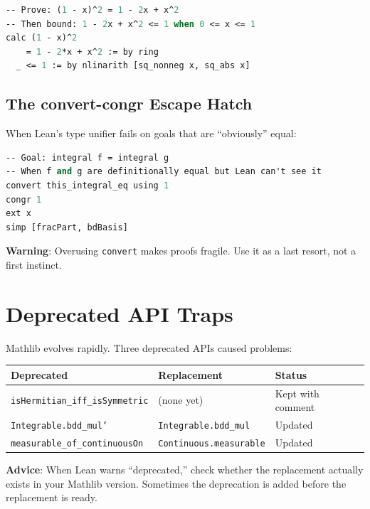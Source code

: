 \documentclass[11pt,a4paper]{article}
\newcommand{\lean}[1]{\texttt{#1}}
\begin{document}
\begin{lstlisting}[language=ML,caption={Algebra then analysis}]
-- Prove: (1 - x)^2 = 1 - 2x + x^2
-- Then bound: 1 - 2x + x^2 <= 1 when 0 <= x <= 1
calc (1 - x)^2
    = 1 - 2*x + x^2 := by ring
  _ <= 1 := by nlinarith [sq_nonneg x, sq_abs x]
\end{lstlisting}

\subsection{The convert-congr Escape Hatch}

When Lean's type unifier fails on goals that are ``obviously'' equal:

\begin{lstlisting}[language=ML,caption={Type unification escape}]
-- Goal: integral f = integral g
-- When f and g are definitionally equal but Lean can't see it
convert this_integral_eq using 1
congr 1
ext x
simp [fracPart, bdBasis]
\end{lstlisting}

\textbf{Warning}: Overusing \lean{convert} makes proofs fragile.
Use it as a last resort, not a first instinct.

\section{Deprecated API Traps}
\label{sec:deprecated}

Mathlib evolves rapidly. Three deprecated APIs caused problems:

\begin{center}
\begin{tabular}{@{}lll@{}}
\toprule
\textbf{Deprecated} & \textbf{Replacement} & \textbf{Status} \\
\midrule
\lean{isHermitian\_iff\_isSymmetric} & (none yet) & Kept with comment \\
\lean{Integrable.bdd\_mul'} & \lean{Integrable.bdd\_mul} & Updated \\
\lean{measurable\_of\_continuousOn} & \lean{Continuous.measurable} & Updated \\
\bottomrule
\end{tabular}
\end{center}

\textbf{Advice}: When Lean warns ``deprecated,'' check whether
the replacement actually exists in your Mathlib version. Sometimes
the deprecation is added before the replacement is ready.
\end{document}
